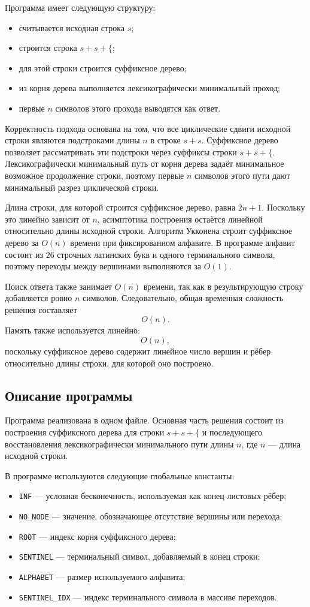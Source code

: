 \documentclass[12pt]{article}
\begin{document}
Программа имеет следующую структуру:
\begin{itemize}
	\item считывается исходная строка $s$;
	\item строится строка $s + s + \texttt{\{}$;
	\item для этой строки строится суффиксное дерево;
	\item из корня дерева выполняется лексикографически минимальный
	проход;
	\item первые $n$ символов этого прохода выводятся как ответ.
\end{itemize}

Корректность подхода основана на том, что все циклические сдвиги исходной
строки являются подстроками длины $n$ в строке $s + s$. Суффиксное дерево
позволяет рассматривать эти подстроки через суффиксы строки
$s + s + \texttt{\{}$. Лексикографически минимальный путь от корня дерева
задаёт минимальное возможное продолжение строки, поэтому первые $n$
символов этого пути дают минимальный разрез циклической строки.

Длина строки, для которой строится суффиксное дерево, равна $2n + 1$.
Поскольку это линейно зависит от $n$, асимптотика построения остаётся
линейной относительно длины исходной строки. Алгоритм Укконена строит
суффиксное дерево за $O(n)$ времени при фиксированном алфавите. В
программе алфавит состоит из $26$ строчных латинских букв и одного
терминального символа, поэтому переходы между вершинами выполняются за
$O(1)$.

Поиск ответа также занимает $O(n)$ времени, так как в результирующую
строку добавляется ровно $n$ символов. Следовательно, общая временная
сложность решения составляет
\[
O(n).
\]
Память также используется линейно:
\[
O(n),
\]
поскольку суффиксное дерево содержит линейное число вершин и рёбер
относительно длины строки, для которой оно построено.

\subsection*{Описание программы}

Программа реализована в одном файле. Основная часть решения состоит из
построения суффиксного дерева для строки $s + s + \texttt{\{}$ и
последующего восстановления лексикографически минимального пути длины
$n$, где $n$ --- длина исходной строки.

В программе используются следующие глобальные константы:
\begin{itemize}
	\item \texttt{INF} --- условная бесконечность, используемая как конец
	листовых рёбер;
	\item \texttt{NO\_NODE} --- значение, обозначающее отсутствие вершины
	или перехода;
	\item \texttt{ROOT} --- индекс корня суффиксного дерева;
	\item \texttt{SENTINEL} --- терминальный символ, добавляемый в конец
	строки;
	\item \texttt{ALPHABET} --- размер используемого алфавита;
	\item \texttt{SENTINEL\_IDX} --- индекс терминального символа в
	массиве переходов.
\end{itemize}
\end{document}
